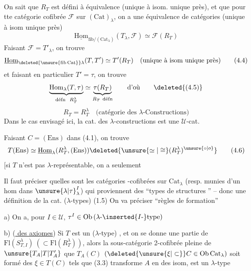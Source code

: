 On sait que $R_T$ est défini à équivalence  (unique à isom.
unique près), et que pour tte catégorie cofibrée $\mathcal F$ sur
$(\mathrm{Cat})_{\lambda}$, on a une équivalence de catégories (unique à isom unique près)
\[
\underline{\mathrm{Hom}}_{\mathrm{fib}/(\mathrm{Cat}_\lambda)}(T_\lambda,\mathcal F)\simeq\mathcal F(R_T)\tag*{(4.3)}
\]
Faisant $\mathcal F=T'_\lambda$, on trouve
\[
\underline{\mathrm{Hom}}_{\deleted{\unsure{\mathrm{fib}\,\mathrm{Cat}}}\lambda}(T,T')\simeq T'(R_T)\quad\text{(unique à isom unique près)}\tag*{(4.4)}
\]
et faisant en particulier $T'=\tau$, on trouve
\[
\underbrace{\mathrm{Hom}_\lambda(T,\tau)}_{\text{défn }\ R_T^\lambda}\simeq
\underbrace{\tau(R_T)}_{R_T\ \text{défn}}\qquad\text{d'où}\tag*{\deleted{(4.5)}}
\]
\[
R_T=R_T^\lambda\quad\text{(catégorie des $\lambda$-Constructions)}\tag*{(4.5)}
\]
 Dans le cas envisagé ici, la
 cat. des $\lambda$-constructions est une $\mathcal U$-cat.

Faisant $C=(\mathrm{Ens})$ dans (4.1), on trouve
\[
T(\mathrm{Ens})\simeq\underline{\mathrm{Hom}}_\lambda(R_T^\lambda,(\mathrm{Ens}))
\deleted{\unsure{\simeq|\cong}(R_T^\lambda)^{\unsure{\circ|o}}}\tag*{(4.6)}
\]
[si $T$ n'est pas $\lambda$-représentable, on a seulement

 Il faut préciser quelles sont  les catégories
-cofibrées sur $\mathrm{Cat}_\lambda$ (resp. munies d'un hom dans $\unsure{\lambda|\tau}_\lambda^I$)
qui proviennent des  ``types de structures '' -- donc
  une définition de la cat. ($\lambda$-types) (1.5)
On va préciser  ``règles de formation''

a)  On a,  pour $I\in\mathcal U$,
$\tau^I\in\mathrm{Ob}\,(\lambda\text{-}\inserted{I\text{-}}\mathrm{type})$

b) (\uline{ des axiomes})  Si $T$ est un ($\lambda$-type) , et
on se donne une  partie  de $\mathrm{Fl}(S_{T,I}^{\lambda})\ (\subset\mathrm{Fl}(R_T^\lambda))$, alors
la sous-catégorie 2-cofibrée pleine de $\unsure{T_A|T|T'_A}$   que
$T_A(C)$ $(\deleted{\unsure{\xi|\subset}}C\in\mathrm{Ob}\,\mathrm{Cat}_\lambda)$ soit formé des $\xi\in T(C)$ tels
que (3.3) transforme $A$ en des isom, est un $\lambda$-type

